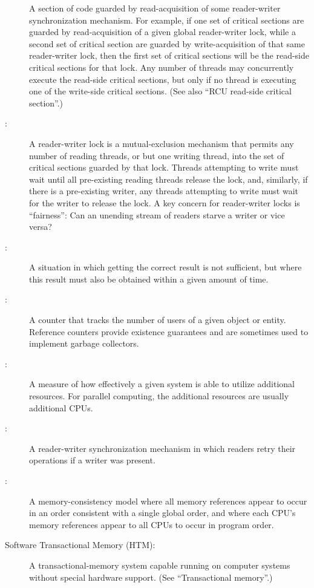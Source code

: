 \begin{description}
	A section of code guarded by read-acquisition of
	some reader-writer synchronization mechanism.
	For example, if one set of critical sections are guarded by
	read-acquisition of
	a given global reader-writer lock, while a second set of critical
	section are guarded by write-acquisition of that same reader-writer
	lock, then the first set of critical sections will be the
	read-side critical sections for that lock.
	Any number of threads may concurrently execute the read-side
	critical sections, but only if no thread is executing one of
	the write-side critical sections.
	(See also ``RCU read-side critical section''.)
\item[\IXGh{Reader-Writer}{Lock}:]
	A reader-writer lock is a mutual-exclusion mechanism that
	permits any number of reading
	threads, or but one writing thread, into the set of critical
	sections guarded by that lock.
	Threads attempting to write must wait until all pre-existing
	reading threads release the lock, and, similarly, if there
	is a pre-existing writer, any threads attempting to write must
	wait for the writer to release the lock.
	A key concern for reader-writer locks is ``fairness'':
	Can an unending stream of readers starve a writer or vice versa?
\item[\IXG{Real Time}:]
	A situation in which getting the correct result is not sufficient,
	but where this result must also be obtained within a given amount
	of time.
\item[\IXG{Reference Count}:]
	A counter that tracks the number of users of a given object or
	entity.
	Reference counters provide existence guarantees and are sometimes
	used to implement garbage collectors.
\item[\IXG{Scalability}:]
	A measure of how effectively a given system is able to utilize
	additional resources.
	For parallel computing, the additional resources are usually
	additional CPUs.
\item[\IXGh{Sequence}{Lock}:]
	A reader-writer synchronization mechanism in which readers
	retry their operations if a writer was present.
\item[\IXGh{Sequential}{Consistency}:]
	A memory-consistency model where all memory references appear to occur
	in an order consistent with
	a single global order, and where each CPU's memory references
	appear to all CPUs to occur in program order.
\item[Software Transactional Memory (HTM):]
	A transactional-memory system capable running on computer systems
	without special hardware support.
	(See ``Transactional memory''.)

\end{description}
